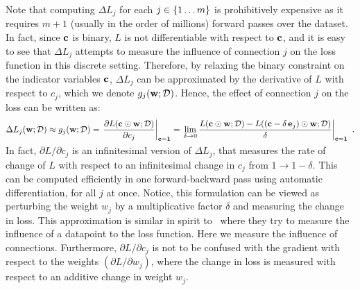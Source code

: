 Note that computing $\Delta L_j$ for each $j\in\{1\ldots m\}$ is prohibitively expensive as it requires $m+1$ (usually in the order of millions) forward passes over the dataset.
In fact, since ${\mathbf{c}}$ is binary, $L$ is not differentiable with respect to ${\mathbf{c}}$, and it is easy to see that $\Delta L_j$ attempts to measure the influence of connection $j$ on the loss function in this discrete setting.
Therefore, by relaxing the binary constraint on the indicator variables ${\mathbf{c}}$, $\Delta L_j$ can be approximated by the derivative of $L$ with respect to $c_j$, which we denote $g_j({\mathbf{w}};{\mathcal{D}})$.
Hence, the effect of connection $j$ on the loss can be written as:
\begin{align}\label{eq:csc}
\Delta L_j({\mathbf{w}};{\mathcal{D}}) &\approx g_j({\mathbf{w}};{\mathcal{D}}) = \left.\frac{\partial L({\mathbf{c}}\odot{\mathbf{w}};{\mathcal{D}})}{\partial c_j}\right|_{{\mathbf{c}}=\boldsymbol{1}} = \left.\lim_{\delta\to 0} \frac{L({\mathbf{c}}
\odot{\mathbf{w}};{\mathcal{D}}) - L(({\mathbf{c}} - \delta\,{\mathbf{e}}_j) \odot{\mathbf{w}};{\mathcal{D}})}{\delta}\right|_{{\mathbf{c}}=\boldsymbol{1}}\
.\\[-7mm]\nonumber
\end{align}
In fact, ${\partial L}/{\partial c_j}$ is an infinitesimal version of $\Delta L_j$, that measures the rate of change of $L$ with respect to an infinitesimal change in $c_j$ from $1 \to 1-\delta$. 
This can be computed efficiently in one forward-backward pass using automatic differentiation, for all $j$ at once.
Notice, this formulation can be viewed as perturbing the weight $w_j$ by a multiplicative factor $\delta$ and measuring the change in loss. 
This approximation is similar in spirit to~\cite{koh2017understanding} where they try to measure the influence of a datapoint to the loss function.
Here we measure the influence of connections.
Furthermore, ${\partial L}/{\partial c_j}$ is not to be confused with the gradient with respect to the weights $\left({\partial L}/{\partial w_j}\right)$, where the change in loss is measured with respect to an additive change in weight $w_j$.

